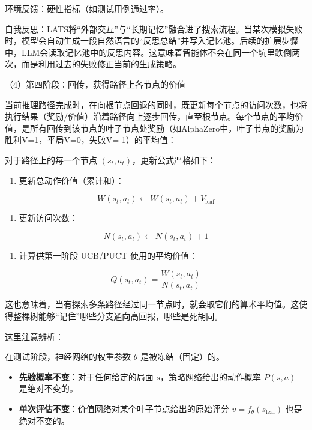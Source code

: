 环境反馈：硬性指标（如测试用例通过率）。

自我反思：LATS将``外部交互''与``长期记忆''融合进了搜索流程。当某次模拟失败时，模型会自动生成一段自然语言的``反思总结''并写入记忆池。后续的扩展步骤中，LLM会读取记忆池中的反思内容。这意味着智能体不会在同一个坑里跌倒两次，而是利用过去的失败修正当前的生成策略。

（4）第四阶段：回传，获得路径上各节点的价值

当前推理路径完成时，在向根节点回退的同时，既更新每个节点的访问次数，也将执行结果（奖励/价值）沿着路径向上逐步回传，直至根节点。每个节点的平均价值，是所有回传到该节点的叶子节点处奖励（如AlphaZero中，叶子节点的奖励为胜利V=1，平局V=0，失败V=-1）的平均值：

对于路径上的每一个节点 \((s_t,a_t)\)，更新公式严格如下：

\begin{enumerate}
\def\labelenumi{\arabic{enumi}.}
\tightlist
\item
{}
  更新总动作价值（累计和）：
\end{enumerate}

\[
W(s_t,a_t)\leftarrow W(s_t,a_t)+V_{\mathrm{leaf}}
\]

\begin{enumerate}
\def\labelenumi{\arabic{enumi}.}
\setcounter{enumi}{1}
\tightlist
\item
{}
  更新访问次数：
\end{enumerate}

\[
N(s_t,a_t)\leftarrow N(s_t,a_t)+1
\]

\begin{enumerate}
\def\labelenumi{\arabic{enumi}.}
\setcounter{enumi}{2}
\tightlist
\item
{}
  计算供第一阶段 UCB/PUCT 使用的平均价值：
\end{enumerate}

\[
Q(s_t,a_t)=\frac{W(s_t,a_t)}{N(s_t,a_t)}
\]

这也意味着，当有探索多条路径经过同一节点时，就会取它们的算术平均值。这使得整棵树能够``记住''哪些分支通向高回报，哪些是死胡同。

这里注意辨析：

在测试阶段，神经网络的权重参数 \(\theta\) 是被冻结（固定）的。

\begin{itemize}
\tightlist
\item
  \textbf{先验概率不变}：对于任何给定的局面 \(s\)，策略网络给出的动作概率 \(P(s,a)\) 是绝对不变的。
\item
  \textbf{单次评估不变}：价值网络对某个叶子节点给出的原始评分 \(v=f_\theta(s_{\mathrm{leaf}})\) 也是绝对不变的。
\end{itemize}


